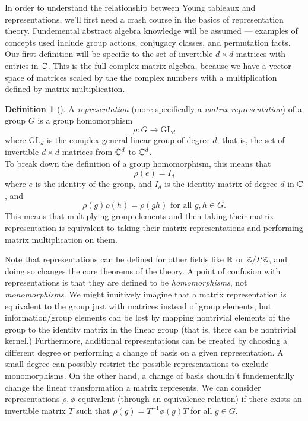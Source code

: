 \documentclass[11 pt]{amsart}
\theoremstyle{plain}   %
\theoremstyle{definition}
\newtheorem{defn}{Definition}[section]
\theoremstyle{remark}
\numberwithin{equation}{section}
\def\GL{\mathrm{GL}} \def\SL{\mathrm{SL}}  \def\SP{\mathrm{SL}}\def\OG{\mathrm{O}}
\begin{document}
In order to understand the relationship between Young tableaux and representations,
we'll first need a crash course in the basics of representation theory.
Fundemental abstract algebra knowledge will be assumed --- examples of concepts used include group actions, conjugacy classes, and
permutation facts.
Our first definition will be specific to the set of invertible $d \times d$ matrices with entries in $\mathbb{C}$.
This is the full complex matrix algebra, because we have a vector space of matrices scaled by the the complex numbers
with a multiplication defined by matrix multiplication.
\begin{defn}[{\cite[Definition 1.2.1]{sagan}}]
  A \emph{representation} (more specifically a \emph{matrix representation}) of a group $G$ is a group homomorphism
  \[\rho: G \to \GL_d\]
  where $\GL_d$ is the complex general linear group of degree $d$; that is, the set of
  invertible $d \times d$ matrices from $\mathbb{C}^d$ to $\mathbb{C}^d$. \\
  To break down the definition of a group homomorphism, this means that
  \[ \rho(e) = I_d\]
  where $e$ is the identity of the group, and $I_d$ is the identity matrix of degree $d$ in $\mathbb{C}$, and
  \[\rho(g)\rho(h) = \rho(gh) \text{ for all $g,h \in G$.}\]
    This means that multiplying group elements and then taking their matrix representation is equivalent to
    taking their matrix representations and performing matrix multiplication on them.
  \end{defn}
  Note that representations can be defined for other fields like $\mathbb{R}$ or $\mathbb{Z}/P\mathbb{Z}$, and doing so changes the core theorems of the theory.
  A point of confusion with representations is that they are defined to be \emph{homomorphisms}, not \emph{monomorphisms}.
  We might inuitively imagine that a matrix representation is equivalent to the group just with matrices instead of group elements,
  but information/group elements can be lost by mapping nontrivial elements of the group to the identity matrix in the linear group
  (that is, there can be nontrivial kernel.)
  Furthermore, additional representations can be created by choosing a different degree or performing a change of basis on a given representation.
  A small degree can possibly restrict the possible representations to exclude monomorphisms.
  On the other hand, a change of basis shouldn't fundementally change the linear transformation a matrix represents.
  We can consider representations $\rho, \phi$ equivalent (through an equivalence relation) if there exists an invertible matrix $T$
  such that $\rho(g) = T^{-1} \phi(g) T$ for all $g \in G$.\par
\end{document}
